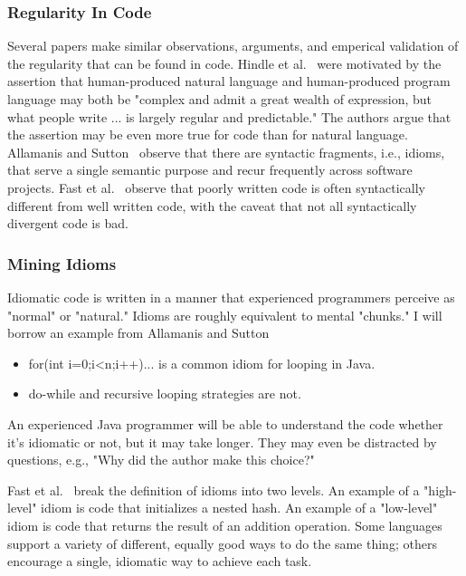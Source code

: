 \subsubsection{Regularity In Code}

Several papers make similar observations, arguments, and emperical validation of the regularity that can be found in code. Hindle et al.~\cite{Hindle2012} were motivated by the assertion that human-produced natural language and human-produced program language may both be "complex and admit a great wealth of expression, but what people write ... is largely regular and predictable." The authors argue that the assertion may be even more true for code than for natural language. Allamanis and Sutton~\cite{allamanis2014mining} observe that there are syntactic fragments, i.e., idioms, that serve a single semantic purpose and recur frequently across software projects. Fast et al.~\cite{codex} observe that poorly written code is often syntactically different from well written code, with the caveat that not all syntactically divergent code is bad.

\subsubsection{Mining Idioms}

Idiomatic code is written in a manner that experienced programmers perceive as "normal" or "natural." Idioms are roughly equivalent to mental "chunks." I will borrow an example from Allamanis and Sutton~\cite{allamanis2014mining}

\begin{itemize}
\item for(int i=0;i<n;i++){...} is a common idiom for looping in Java.
\item do-while and recursive looping strategies are not.
\end{itemize}

An experienced Java programmer will be able to understand the code whether it's idiomatic or not, but it may take longer. They may even be distracted by questions, e.g., "Why did the author make this choice?"

Fast et al.~\cite{codex} break the definition of idioms into two levels. An example of a "high-level" idiom is code that initializes a nested hash. An example of a "low-level" idiom is code that returns the result of an addition operation. Some languages support a variety of different, equally good ways to do the same thing; others encourage a single, idiomatic way to achieve each task.

